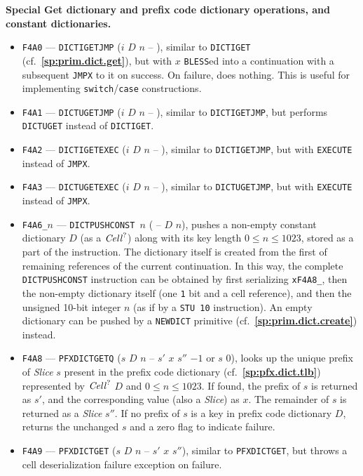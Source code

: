\documentclass[12pt,oneside]{article}
\def\makepoint#1{\medbreak\noindent{\bf #1.\ }}
\def\nxsubpoint{\refstepcounter{subsubsection}%
  \smallbreak\makepoint{\thesubsubsection}}
\def\refpoint#1{{\rm\textbf{\ref{#1}}}}
\let\ptref=\refpoint
\def\emb#1{\textbf{#1.}}
\begin{document}
\nxsubpoint\label{sp:prim.dict.get.spec}\emb{Special {\sc Get} dictionary and prefix code dictionary operations, and constant dictionaries}
\begin{itemize}
\item {\tt F4A0} --- {\tt DICTIGETJMP} ($i$ $D$ $n$ -- ), similar to {\tt DICTIGET} (cf.~\ptref{sp:prim.dict.get}), but with $x$ {\tt BLESS}ed into a continuation with a subsequent {\tt JMPX} to it on success. On failure, does nothing. This is useful for implementing {\tt switch}/{\tt case} constructions.
\item {\tt F4A1} --- {\tt DICTUGETJMP} ($i$ $D$ $n$ -- ), similar to {\tt DICTIGETJMP}, but performs {\tt DICTUGET} instead of {\tt DICTIGET}.
\item {\tt F4A2} --- {\tt DICTIGETEXEC} ($i$ $D$ $n$ -- ), similar to {\tt DICTIGETJMP}, but with {\tt EXECUTE} instead of {\tt JMPX}.
\item {\tt F4A3} --- {\tt DICTUGETEXEC} ($i$ $D$ $n$ -- ), similar to {\tt DICTUGETJMP}, but with {\tt EXECUTE} instead of {\tt JMPX}.
\item {\tt F4A6\_$n$} --- {\tt DICTPUSHCONST $n$} ( -- $D$ $n$), pushes a non-empty constant dictionary $D$ (as a $\textit{Cell\/}^?$) along with its key length $0\leq n\leq 1023$, stored as a part of the instruction. The dictionary itself is created from the first of remaining references of the current continuation. In this way, the complete {\tt DICTPUSHCONST} instruction can be obtained by first serializing {\tt xF4A8\_}, then the non-empty dictionary itself (one {\tt 1} bit and a cell reference), and then the unsigned 10-bit integer $n$ (as if by a {\tt STU 10} instruction). An empty dictionary can be pushed by a {\tt NEWDICT} primitive (cf.~\ptref{sp:prim.dict.create}) instead.
\item {\tt F4A8} --- {\tt PFXDICTGETQ} ($s$ $D$ $n$ -- $s'$ $x$ $s''$ $-1$ or $s$ $0$), looks up the unique prefix of {\em Slice} $s$ present in the prefix code dictionary (cf.~\ptref{sp:pfx.dict.tlb}) represented by $\textit{Cell\/}^?$ $D$ and $0\leq n\leq 1023$. If found, the prefix of $s$ is returned as $s'$, and the corresponding value (also a {\em Slice}) as $x$. The remainder of $s$ is returned as a {\em Slice\/} $s''$. If no prefix of $s$ is a key in prefix code dictionary $D$, returns the unchanged $s$ and a zero flag to indicate failure.
\item {\tt F4A9} --- {\tt PFXDICTGET} ($s$ $D$ $n$ -- $s'$ $x$ $s''$), similar to {\tt PFXDICTGET}, but throws a cell deserialization failure exception on failure.

\end{itemize}
\end{document}
